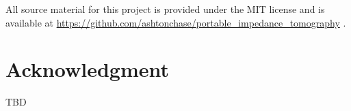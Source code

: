 \documentclass[]{IEEEtran}
\begin{document}

%
All source material for this project is provided under the MIT license and is available at \url{https://github.com/ashtonchase/portable_impedance_tomography} . 

\section*{Acknowledgment}
TBD


\ifCLASSOPTIONcaptionsoff
  \newpage
\fi







%
 
\end{document}
